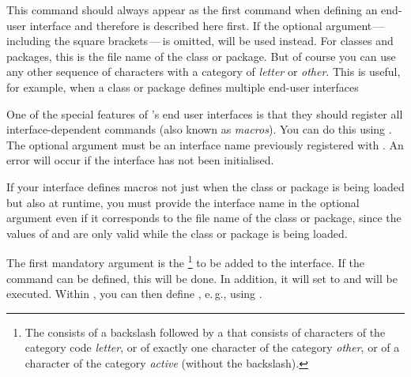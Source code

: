 This command should always appear as the first command when defining an
end-user interface and therefore is described here first. If the optional
argument\,---\,including the square brackets\,---\,is omitted,
 will be used instead. For classes
and packages, this is the file name of the class or package. But of course you
can use any other sequence of characters with a category of \emph{letter} or
\emph{other}. This is useful, for example, when a class or package defines
multiple end-user interfaces%
\EndIndexGroup


\begin{Declaration}
\end{Declaration}
One of the special features of 's end user interfaces is
that they should register all interface-dependent commands (also known as
\emph{macros}). You can do this using . The
optional argument  must be an interface name previously
registered with . An error will
occur if the interface has not been initialised.

If your interface defines macros not just when the class
or package is being loaded but also at runtime, you must provide the interface
name in the optional argument even if it corresponds to the file name of the
class or package, since the values of  and 
are only valid while the class or package is being loaded.

The first mandatory argument is the \footnote{The
   consists of a backslash followed by a  that consists of characters of the category code \emph{letter},
  or of exactly one character of the category \emph{other}, or of a character
  of the category \emph{active} (without the backslash).} to be added to the
interface. If the command can be defined, this will be done. In addition, it
will set to  and  will be executed. Within
, you can then define , e.\,g., using
.


